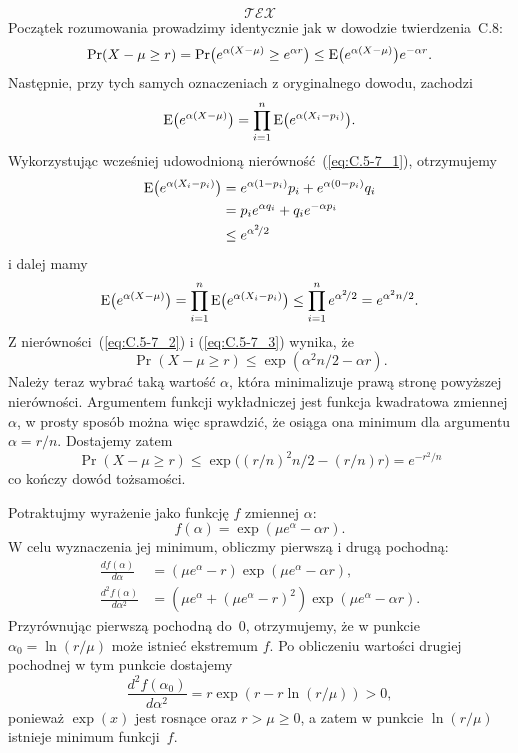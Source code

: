 \begin{equation}
	\mathcal{TEX} \label{eq:C.5-7_1}
\end{equation}
Początek rozumowania prowadzimy identycznie jak w dowodzie twierdzenia~C.8:
\begin{equation}
	\Pr(X-\mu\ge r) = \Pr\bigl(e^{\alpha(X-\mu)}\ge e^{\alpha r}\bigr) \le \operatorname{E}\bigl(e^{\alpha(X-\mu)}\bigr)e^{-\alpha r}. \label{eq:C.5-7_2}
\end{equation}
Następnie, przy tych samych oznaczeniach z oryginalnego dowodu, zachodzi
\[
	\operatorname{E}\bigl(e^{\alpha(X-\mu)}\bigr) = \prod_{i=1}^n\operatorname{E}\bigl(e^{\alpha(X_i-p_i)}\bigr).
\]
Wykorzystując wcześniej udowodnioną nierówność~(\ref{eq:C.5-7_1}), otrzymujemy
\begin{align*}
	\operatorname{E}\bigl(e^{\alpha(X_i-p_i)}\bigr) &= e^{\alpha(1-p_i)}p_i+e^{\alpha(0-p_i)}q_i \\
	&= p_ie^{\alpha q_i}+q_ie^{-\alpha p_i} \\
	&\le e^{\alpha^2\!/2}
\end{align*}
i dalej mamy
\begin{equation}
	\operatorname{E}\bigl(e^{\alpha(X-\mu)}\bigr) = \prod_{i=1}^n\operatorname{E}\bigl(e^{\alpha(X_i-p_i)}\bigr) \le \prod_{i=1}^ne^{\alpha^2\!/2} = e^{\alpha^2n/2}. \label{eq:C.5-7_3}
\end{equation}
Z nierówności~(\ref{eq:C.5-7_2}) i (\ref{eq:C.5-7_3}) wynika, że
\[
	\Pr(X-\mu\ge r) \le \exp(\alpha^2n/2-\alpha r).
\]
Należy teraz wybrać taką wartość $\alpha$, która minimalizuje prawą stronę powyższej nierówności. Argumentem funkcji wykładniczej jest funkcja kwadratowa zmiennej $\alpha$, w prosty sposób można więc sprawdzić, że osiąga ona minimum dla argumentu $\alpha=r/n$. Dostajemy zatem
\[
	\Pr(X-\mu\ge r) \le \exp\bigl((r/n)^2n/2-(r/n)r\bigr) = e^{-r^2\!/n}
\]
co kończy dowód tożsamości.

\exercise{} %
\noindent Potraktujmy wyrażenie jako funkcję $f$ zmiennej $\alpha$:
\[
	f(\alpha) = \exp(\mu e^\alpha-\alpha r).
\]
W celu wyznaczenia jej minimum, obliczmy pierwszą i drugą pochodną:
\begin{align*}
	\frac{df(\alpha)}{d\alpha} &= (\mu e^\alpha-r)\exp(\mu e^\alpha-\alpha r), \\
	\frac{d^2f(\alpha)}{d\alpha^2} &= \left(\mu e^\alpha+(\mu e^\alpha-r)^2\right)\exp(\mu e^\alpha-\alpha r).
\end{align*}
Przyrównując pierwszą pochodną do~0, otrzymujemy, że w punkcie $\alpha_0=\ln(r/\mu)$ może istnieć ekstremum $f$. Po obliczeniu wartości drugiej pochodnej w tym punkcie dostajemy
\[
	\frac{d^2f(\alpha_0)}{d\alpha^2} = r\exp(r-r\ln(r/\mu)) > 0,
\]
ponieważ $\exp(x)$ jest rosnące oraz $r>\mu\ge0$, a zatem w punkcie $\ln(r/\mu)$ istnieje minimum funkcji~$f$.


